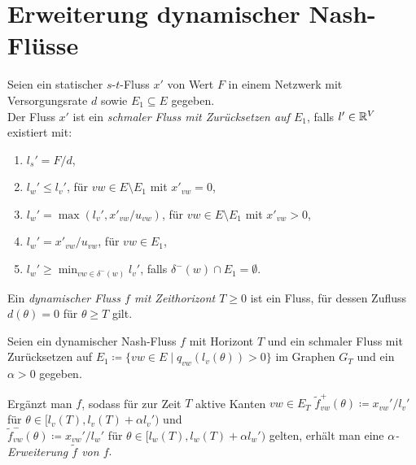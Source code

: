 \section{Erweiterung dynamischer Nash-Flüsse}

\begin{frame}\begin{definition}\label{def-thin-flow}
		Seien ein statischer $s$-$t$-Fluss $x'$ von Wert $F$ in einem Netzwerk mit Versorgungsrate $d$ sowie $E_1\subseteq E$ gegeben. \\
		Der Fluss $x'$ ist ein \emph{schmaler Fluss mit Zurücksetzen auf $E_1$}, falls $l'\in\mathbb{R}^V$ existiert mit:
		\begin{enumerate}[label=(T\arabic*)]
			\item\label{def-thin-flow-source} $l_s' = F/d$,
			\item\label{def-thin-flow-x-zero} $l_w' \leq l_v'$, \tabto{5cm} für $vw\in E \setminus E_1$ mit $x'_{vw}=0$,
			\item\label{def-thin-flow-x-positive} $l_w' = \max(l_v', x'_{vw} / u_{vw} )$, \tabto{5cm} für $vw\in E\setminus E_1$ mit $x'_{vw} > 0$,
			\item\label{def-thin-flow-resetting-edge} $l_w' = x'_{vw} / u_{vw}$, \tabto{5cm} für $vw\in E_1$,
			\item\label{def-thin-flow-no-resetting-edge} $l_w' \geq \min_{vw\in \delta^-(w)} l_v'$, \tabto{5cm} falls $\delta^-(w)\cap E_1 = \emptyset$.
		\end{enumerate}
	\end{definition}
\end{frame}

\begin{frame}
	\begin{definition}
		Ein \emph{dynamischer Fluss $f$ mit Zeithorizont $T\geq0$} ist ein Fluss, für dessen Zufluss $d(\theta)= 0$ für $\theta\geq T$ gilt.
	\end{definition}

	\begin{definition}
		Seien ein dynamischer Nash-Fluss $f$ mit Horizont $T$ und ein schmaler Fluss mit Zurücksetzen auf $E_1 \coloneq \{ vw\in E \mid q_{vw}(l_v(\theta)) > 0 \}$ im Graphen $G_T$ und ein $\alpha > 0$ gegeben.
		
		Ergänzt man $f$, sodass für zur Zeit $T$ aktive Kanten $vw\in E_T$
		$\tilde{f}_{vw}^+(\theta)\coloneq x_{vw}'/l_v'$ für $\theta\in [l_v(T), l_v(T)+\alpha l_v')$ und \\
		$\tilde{f}_{vw}^-(\theta)\coloneq x_{vw}'/l_w'$ für $\theta\in [l_w(T), l_w(T)+\alpha l_w')$
		gelten, erhält man eine \emph{$\alpha$-Erweiterung $\tilde{f}$ von $f$}.
	\end{definition}
\end{frame}

